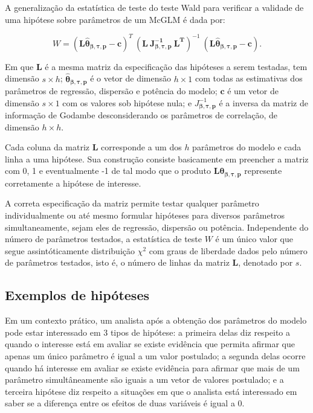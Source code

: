 A generalização da estatística de teste do teste Wald para verificar a validade de uma hipótese sobre parâmetros de um McGLM é dada por:

\begin{equation}
W = (\boldsymbol{L\hat\theta_{\beta,\tau,p}} - \boldsymbol{c})^T \ (\boldsymbol{L \ J_{\boldsymbol{{\beta,\tau,p}}}^{-1} \ L^T})^{-1} \ (\boldsymbol{L\hat\theta_{\beta,\tau,p}} - \boldsymbol{c}).
\end{equation}

\noindent Em que $\boldsymbol{L}$ é a mesma matriz da especificação das hipóteses a serem testadas, tem dimensão $s \times h$; $\boldsymbol{\hat\theta_{\beta,\tau,p}}$ é o vetor de dimensão $h \times 1$ com todas as estimativas dos parâmetros de regressão, dispersão e potência do modelo; $\boldsymbol{c}$ é um vetor de dimensão $s \times 1$ com os valores sob hipótese nula; e $J_{\boldsymbol{{\beta,\tau,p}}}^{-1}$ é a inversa da matriz de informação de Godambe desconsiderando os parâmetros de correlação, de dimensão $h \times h$.

Cada coluna da matriz $\boldsymbol{L}$ corresponde a um dos $h$ parâmetros do modelo e cada linha a uma hipótese. Sua construção consiste basicamente em preencher a matriz com 0, 1 e eventualmente -1 de tal modo que o produto $\boldsymbol{L}\boldsymbol{\theta_{\beta,\tau,p}}$ represente corretamente a hipótese de interesse.

A correta especificação da matriz permite testar qualquer parâmetro individualmente ou até mesmo formular hipóteses para diversos parâmetros simultaneamente, sejam eles de regressão, dispersão ou potência. Independente do número de parâmetros testados, a estatística de teste $W$ é um único valor que segue assintóticamente distribuição $\chi^2$ com graus de liberdade dados pelo número de parâmetros testados, isto é, o número de linhas da matriz $\boldsymbol{L}$, denotado por $s$.

\subsection{Exemplos de hipóteses}

Em um contexto prático, um analista após a obtenção dos parâmetros do modelo pode estar interessado em 3 tipos de hipótese: a primeira delas diz respeito a quando o interesse está em avaliar se existe evidência que permita afirmar que apenas um único parâmetro é igual a um valor postulado; a segunda delas ocorre quando há interesse em avaliar se existe evidência para afirmar que mais de um parâmetro simultâneamente são iguais a um vetor de valores postulado; e a terceira hipótese diz respeito a situações em que o analista está interessado em saber se a diferença entre os efeitos de duas variáveis é igual a 0.


